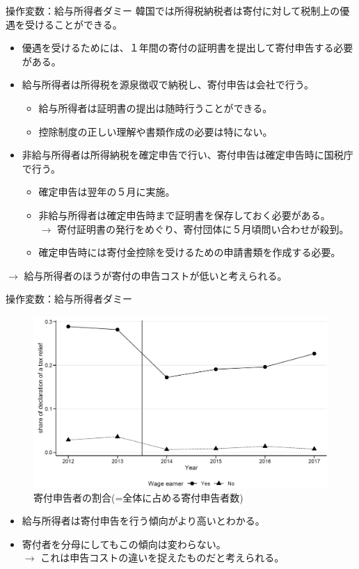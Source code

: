 \documentclass[dvipdfmx,10pt]{beamer}
\begin{document}
	\begin{frame}{操作変数：給与所得者ダミー}
		韓国では所得税納税者は寄付に対して税制上の優遇を受けることができる。
		\begin{itemize}
			\item 優遇を受けるためには、１年間の寄付の証明書を提出して寄付申告する必要がある。
			\item 給与所得者は所得税を源泉徴収で納税し、寄付申告は会社で行う。
			\begin{itemize}
				\item 給与所得者は証明書の提出は随時行うことができる。
				\item 控除制度の正しい理解や書類作成の必要は特にない。
			\end{itemize}
			\item 非給与所得者は所得納税を確定申告で行い、寄付申告は確定申告時に国税庁で行う。			
			\begin{itemize}
				\item 確定申告は翌年の５月に実施。
				\item 非給与所得者は確定申告時まで証明書を保存しておく必要がある。\\
				$\to$ 寄付証明書の発行をめぐり、寄付団体に５月頃問い合わせが殺到。
				\item 確定申告時には寄付金控除を受けるための申請書類を作成する必要。
			\end{itemize}
		\end{itemize}
	$\to$ 給与所得者のほうが寄付の申告コストが低いと考えられる。
	\end{frame}
\begin{frame}{操作変数：給与所得者ダミー}
	\begin{figure}
		\centering
		\includegraphics[width=0.7\linewidth]{Fig_Declaration}
		\caption{寄付申告者の割合(=全体に占める寄付申告者数)}
		\label{fig:4}
	\end{figure}
	\small
	\begin{itemize}
		\item 給与所得者は寄付申告を行う傾向がより高いとわかる。
		\item 寄付者を分母にしてもこの傾向は変わらない。\\
		$\to$ これは申告コストの違いを捉えたものだと考えられる。
	\end{itemize}
\end{frame}
\end{document}

